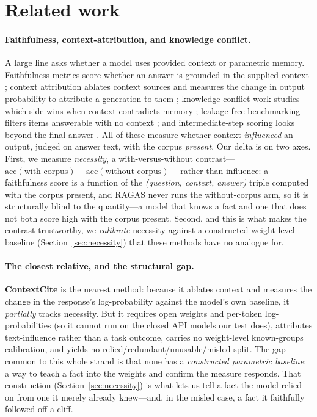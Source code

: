 \documentclass{article}
\begin{document}
\section{Related work}
\label{sec:related}
\paragraph{Faithfulness, context-attribution, and knowledge conflict.} A large line asks whether a
model uses provided context or parametric memory. Faithfulness metrics score whether an answer is
grounded in the supplied context \citep{ragas2023}; context attribution ablates context sources and
measures the change in output probability to attribute a generation to them \citep{contextcite2024,
priordominance2026}; knowledge-conflict work studies which side wins when context contradicts memory
\citep{knowledgeconflicts2024, faithfulrag2025}; leakage-free benchmarking filters items answerable
with no context \citep{seedrg2026}; and intermediate-step scoring looks beyond the final answer
\citep{cuer2026}. All of these measure whether context \emph{influenced} an output, judged on answer
text, with the corpus \emph{present}. Our delta is on two axes. First, we measure \emph{necessity}, a
with-versus-without contrast---$\mathrm{acc}(\text{with corpus})-\mathrm{acc}(\text{without corpus})$
---rather than influence: a faithfulness score is a function of the \emph{(question, context, answer)}
triple computed with the corpus present, and RAGAS never runs the without-corpus arm, so it is
structurally blind to the quantity---a model that knows a fact and one that does not both score high
with the corpus present. Second, and this is what makes the contrast trustworthy, we \emph{calibrate}
necessity against a constructed weight-level baseline (Section~\ref{sec:necessity}) that these methods
have no analogue for.

\paragraph{The closest relative, and the structural gap.} \textbf{ContextCite} \citep{contextcite2024}
is the nearest method: because it ablates context and measures the change in the response's
log-probability against the model's own baseline, it \emph{partially} tracks necessity. But it requires
open weights and per-token log-probabilities (so it cannot run on the closed API models our test
does), attributes text-influence rather than a task outcome, carries no weight-level known-groups
calibration, and yields no relied/redundant/unusable/misled split. The gap common to this whole
strand is that none has a \emph{constructed parametric baseline}: a way to teach a fact into the
weights and confirm the measure responds. That construction (Section~\ref{sec:necessity}) is what lets
us tell a fact the model relied on from one it merely already knew---and, in the misled case, a fact it
faithfully followed off a cliff.
\end{document}
